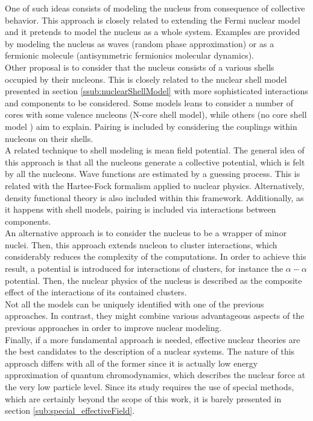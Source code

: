 \documentclass[openany]{book}
\begin{document}
One of such ideas consists of modeling  the nucleus from  consequence of collective behavior. This approach is closely related to extending the Fermi nuclear model and it pretends to model the nucleus as a whole system. Examples are provided by modeling the nucleus as waves (random phase approximation) or as a fermionic molecule (antisymmetric fermionics molecular dynamics).  \\

Other proposal is to consider that the nucleus consists of a various shells occupied by their nucleons. This is closely related to the nuclear shell model presented in section \ref{ssub:nuclearShellModel} with more sophisticated interactions and components to be considered. Some models leans to consider a number of cores with some valence nucleons (N-core shell model), while others (no core  shell model ) aim to explain. Pairing is included by considering the couplings within nucleons on their shells.  \\

A related technique to shell modeling is mean field potential. The general idea of this approach is that all the nucleons generate a collective potential, which is felt by all the nucleons. Wave functions are estimated by a guessing process. This is related with the Hartee-Fock formalism applied to nuclear physics. Alternatively, density functional theory is also included within this framework. Additionally, as it happens with shell models, pairing is included via interactions between components. \\

An alternative approach is to consider the nucleus to be a wrapper of minor nuclei. Then, this approach extends nucleon to cluster interactions, which considerably reduces the complexity of the computations. In order to achieve this result, a potential is introduced for interactions of clusters, for instance the $\alpha-\alpha$ potential. Then, the nuclear physics of the nucleus is described as the composite effect of the interactions of its contained clusters. \\

Not all the models can be uniquely identified with one of the previous approaches. In contrast, they might combine various advantageous aspects of the previous approaches in order to improve nuclear modeling.\\

Finally, if a more fundamental approach is needed, effective nuclear theories are the best candidates to the description of a nuclear systems. The nature of this approach differs with all of the former since it is actually low energy approximation of quantum chromodynamics, which describes the nuclear force at the very low particle level.  Since its study requires the use of special methods, which are certainly beyond the scope of this work, it is barely presented in section \ref{sub:special_effectiveField}. \\
\end{document}
